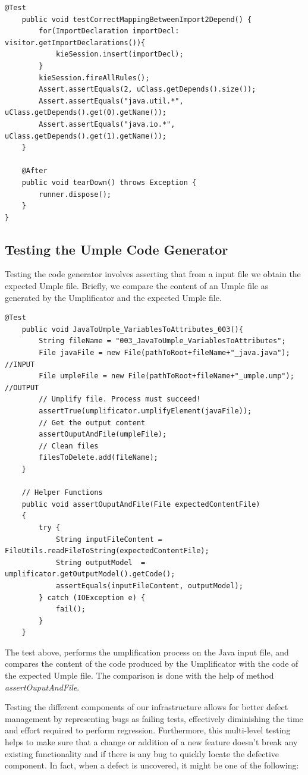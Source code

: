 \begin{lstlisting}[style=java]
	@Test
	public void testCorrectMappingBetweenImport2Depend() {
		for(ImportDeclaration importDecl: visitor.getImportDeclarations()){
			kieSession.insert(importDecl);
		}
		kieSession.fireAllRules();
		Assert.assertEquals(2, uClass.getDepends().size());
		Assert.assertEquals("java.util.*", uClass.getDepends().get(0).getName());
		Assert.assertEquals("java.io.*", uClass.getDepends().get(1).getName());
	}
	
	@After
	public void tearDown() throws Exception {
		runner.dispose();		
	}
}
\end{lstlisting}

\subsection{Testing the Umple Code Generator}

Testing the code generator involves asserting that from a input file we obtain the expected Umple file. Briefly, we
compare the content of an Umple file as generated by the Umplificator and the expected Umple file. 

\begin{lstlisting}[style=java]
	@Test
	public void JavaToUmple_VariablesToAttributes_003(){
		String fileName = "003_JavaToUmple_VariablesToAttributes";
		File javaFile = new File(pathToRoot+fileName+"_java.java"); //INPUT
		File umpleFile = new File(pathToRoot+fileName+"_umple.ump"); //OUTPUT
		// Umplify file. Process must succeed!
		assertTrue(umplificator.umplifyElement(javaFile));
		// Get the output content
		assertOuputAndFile(umpleFile);
		// Clean files 
		filesToDelete.add(fileName);
	}
	
	// Helper Functions
	public void assertOuputAndFile(File expectedContentFile)
	{
		try {
			String inputFileContent = FileUtils.readFileToString(expectedContentFile);
			String outputModel  = umplificator.getOutputModel().getCode();
			assertEquals(inputFileContent, outputModel);
		} catch (IOException e) {
			fail();
		}
	}
\end{lstlisting}

The test above, performs the umplification process on the Java input file, and compares the content of the code produced by the Umplificator with the code of the expected Umple file. The comparison is done with the help of method \textit{assertOuputAndFile}.

Testing the different components of our infrastructure allows for better defect management by representing bugs as failing tests, effectively diminishing the time and effort required to perform regression. Furthermore, this multi-level testing helps to make sure that a change or addition of a new feature doesn't break any existing functionality and if there is any bug to quickly locate the defective component. In fact, when a defect is uncovered, it might be one of the following:

